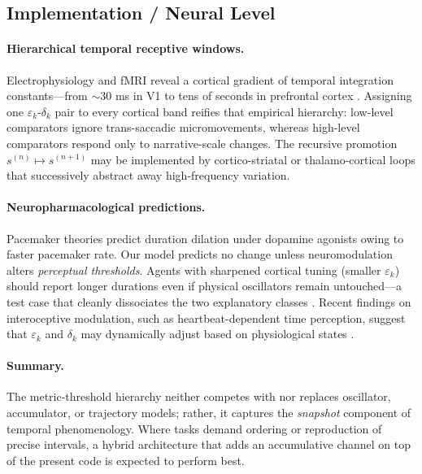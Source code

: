 \documentclass[preprint,11pt]{elsarticle}
\begin{document}
\subsection{Implementation / Neural Level}
\paragraph{Hierarchical temporal receptive windows.}
Electrophysiology and fMRI reveal a cortical gradient of temporal
integration constants—from $\sim\!30$ ms in V1 to tens of seconds in
prefrontal cortex \citep{hasson2008hierarchical}.  Assigning one
$\varepsilon_k$-$\delta_k$ pair to every cortical band reifies that
empirical hierarchy: low-level comparators ignore trans-saccadic
micromovements, whereas high-level comparators respond only to
narrative-scale changes.  The recursive promotion
$s^{(n)}\!\mapsto\!s^{(n+1)}$ may be implemented by cortico-striatal or
thalamo-cortical loops that successively abstract away high-frequency
variation.

\paragraph{Neuropharmacological predictions.}
Pacemaker theories predict duration dilation under dopamine
agonists owing to faster pacemaker rate.  Our model predicts no change
unless neuromodulation alters \emph{perceptual thresholds}.  Agents
with sharpened cortical tuning (smaller $\varepsilon_k$) should report
longer durations even if physical oscillators remain untouched—a test
case that cleanly dissociates the two explanatory classes
\citep{jazayeri2015}. Recent findings on interoceptive modulation, such
as heartbeat-dependent time perception, suggest that $\varepsilon_k$ and
$\delta_k$ may dynamically adjust based on physiological states
\citep{Arslanova2023}.

\paragraph{Summary.}
The metric-threshold hierarchy neither competes with nor replaces
oscillator, accumulator, or trajectory models; rather, it captures the
\emph{snapshot} component of temporal phenomenology.  Where tasks
demand ordering or reproduction of precise intervals, a hybrid
architecture that adds an accumulative channel on top of the present
code is expected to perform best.

\end{document}
